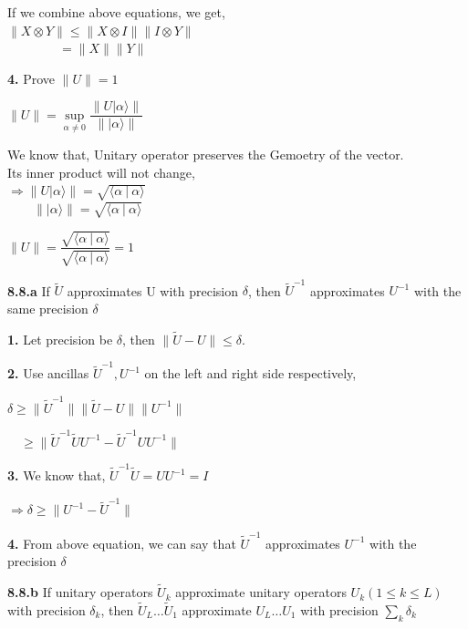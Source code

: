 \documentclass [12pt]{article}
\theoremstyle{definition}
\newcommand{\ket}[1]{| {#1} \rangle}
\newcommand{\braket}[2]{\langle #1 \ | \ #2 \rangle}
\begin{document}
 \phantom{1000em} If we combine above equations, we get, \\
 \phantom{1000em} $\|X \otimes Y \| \leq \|X \otimes I \| \| I \otimes Y \|$\\
 \phantom{1000em} $\quad\quad\quad\quad = \| X\| \| Y\|$
 
 \phantom{1em} {\bf 4.} Prove $\|U\| = 1$
 
 \phantom{1000em} $\|U\| = \sup\limits_{\alpha \neq 0} \dfrac{\|U\ket{\alpha}\|}{\| \ket{\alpha}\|}$  
 
 \phantom{1000em} We know that, Unitary operator preserves the Gemoetry of the vector. \\
 \phantom{1000em} Its inner product will not change,\\
 \phantom{1000em} $\Rightarrow \|U\ket{\alpha}\| = \sqrt{\braket{\alpha}{\alpha}}$\\
 \phantom{1000em} $\quad\quad\|\ket{\alpha}\| = \sqrt{\braket{\alpha}{\alpha}}$
 
 \phantom{1000em} $\|U\| = \dfrac{\sqrt{\braket{\alpha}{\alpha}}}{\sqrt{\braket{\alpha}{\alpha}}} = 1$
 
 {\bf 8.8.a} If $\tilde{U}$ approximates U with precision $\delta$, then $\tilde{U}^{-1}$ approximates $U^{-1}$ with the same precision $\delta$ 
 
 \phantom{1em} {\bf 1.} Let precision be $\delta$, then $\|\tilde{U} - U \| \leq \delta$. 
  
 \phantom{1em} {\bf 2.} Use ancillas $\tilde{U}^{-1}, U^{-1}$ on the left and right side respectively,
  
 \phantom{1000em} $\delta \geq \|\tilde{U}^{-1}\| \|\tilde{U} - U\| \|U^{-1}\|$
  
 \phantom{1000em} $\quad\geq \|\tilde{U}^{-1}\tilde{U}U^{-1} - \tilde{U}^{-1}UU^{-1}\|$ 
  
 \phantom{1em} {\bf 3.} We know that, $\tilde{U}^{-1}\tilde{U} = UU^{-1} = I$
  
 \phantom{1000em} $\Rightarrow \delta \geq \|U^{-1} - \tilde{U}^{-1}\|$
  
 \phantom{1em} {\bf 4.} From above equation, we can say that $\tilde{U}^{-1}$ approximates $U^{-1}$ with the precision $\delta$
   
 {\bf 8.8.b} If unitary operators $\tilde{U}_{k}$ approximate unitary operators $U_{k} (1 \leq k \leq L)$ with precision $\delta_{k}$, 
 \phantom{1000em} then $\tilde{U}_{L} \ldots \tilde{U}_{1}$ approximate $U_{L} \ldots U_{1}$ with precision $\sum_{k}\delta_{k}$
 
\end{document}
